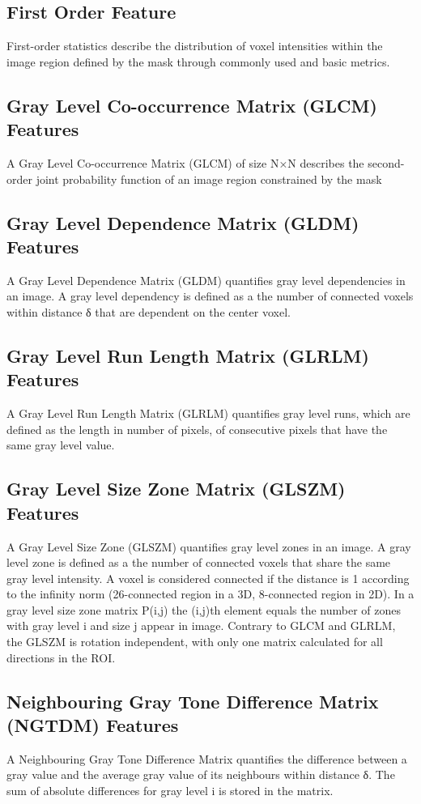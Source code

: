 \documentclass[12pt]{article}
\begin{document}
	\subsection{First Order Feature}
First-order statistics describe the distribution of voxel intensities within the image region defined by the mask through commonly used and basic metrics.

	\subsection{Gray Level Co-occurrence Matrix (GLCM) Features}
A Gray Level Co-occurrence Matrix (GLCM) of size N×N describes the second-order joint probability function of an image region constrained by the mask 

	\subsection{Gray Level Dependence Matrix (GLDM) Features}
A Gray Level Dependence Matrix (GLDM) quantifies gray level dependencies in an image. A gray level dependency is defined as a the number of connected voxels within distance δ that are dependent on the center voxel. 

	\subsection{Gray Level Run Length Matrix (GLRLM) Features}
A Gray Level Run Length Matrix (GLRLM) quantifies gray level runs, which are defined as the length in number of pixels, of consecutive pixels that have the same gray level value.

	\subsection{Gray Level Size Zone Matrix (GLSZM) Features}
A Gray Level Size Zone (GLSZM) quantifies gray level zones in an image. A gray level zone is defined as a the number of connected voxels that share the same gray level intensity. A voxel is considered connected if the distance is 1 according to the infinity norm (26-connected region in a 3D, 8-connected region in 2D). In a gray level size zone matrix P(i,j) the (i,j)th element equals the number of zones with gray level i and size j appear in image. Contrary to GLCM and GLRLM, the GLSZM is rotation independent, with only one matrix calculated for all directions in the ROI.

	\subsection{Neighbouring Gray Tone Difference Matrix (NGTDM) Features}
A Neighbouring Gray Tone Difference Matrix quantifies the difference between a gray value and the average gray value of its neighbours within distance δ. The sum of absolute differences for gray level i is stored in the matrix. 
\end{document}
